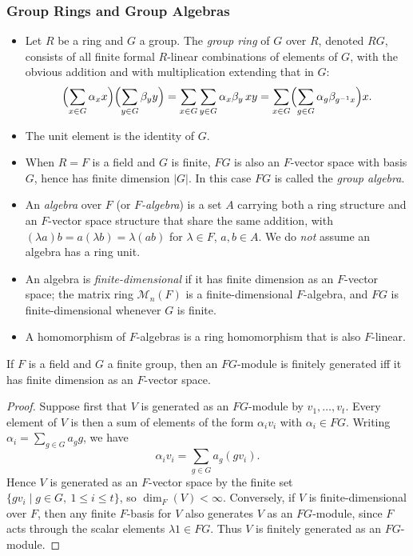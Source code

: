 \documentclass[../Odyssey_Project.tex]{subfiles}
\begin{document}
\subsubsection*{Group Rings and Group Algebras}
\begin{itemize}
    \item Let $R$ be a ring and $G$ a group. The \emph{group ring} of $G$ over $R$, denoted $RG$, consists of all finite formal $R$-linear combinations of elements of $G$, with the obvious addition and with multiplication extending that in $G$:
    \[
        \Bigl(\sum_{x \in G} \alpha_x x\Bigr)\Bigl(\sum_{y \in G} \beta_y y\Bigr) = \sum_{x \in G}\sum_{y \in G} \alpha_x \beta_y\, xy = \sum_{x \in G}\Bigl(\sum_{g \in G} \alpha_g \beta_{g^{-1} x}\Bigr) x.
    \]
    \item The unit element is the identity of $G$.
    \item When $R = F$ is a field and $G$ is finite, $FG$ is also an $F$-vector space with basis $G$, hence has finite dimension $|G|$. In this case $FG$ is called the \emph{group algebra}.
    \item An \emph{algebra} over $F$ (or \emph{$F$-algebra}) is a set $A$ carrying both a ring structure and an $F$-vector space structure that share the same addition, with $(\lambda a)b = a(\lambda b) = \lambda(ab)$ for $\lambda \in F$, $a, b \in A$. We do \emph{not} assume an algebra has a ring unit.
    \item An algebra is \emph{finite-dimensional} if it has finite dimension as an $F$-vector space; the matrix ring $\mathcal{M}_n(F)$ is a finite-dimensional $F$-algebra, and $FG$ is finite-dimensional whenever $G$ is finite.
    \item A homomorphism of $F$-algebras is a ring homomorphism that is also $F$-linear.
\end{itemize}

\begin{lemma}
\label{lem:12.5}
If $F$ is a field and $G$ a finite group, then an $FG$-module is finitely generated iff it has finite dimension as an $F$-vector space.
\end{lemma}
\begin{proof}
    Suppose first that $V$ is generated as an $FG$-module by $v_1,\ldots,v_t$. Every element of $V$ is then a sum of elements of the form $\alpha_i v_i$ with $\alpha_i \in FG$. Writing $\alpha_i = \sum_{g \in G} a_g g$, we have
    \[
        \alpha_i v_i = \sum_{g \in G} a_g(gv_i).
    \]
    Hence $V$ is generated as an $F$-vector space by the finite set $\{gv_i \mid g \in G,\ 1 \leq i \leq t\}$, so $\dim_F(V) < \infty$. Conversely, if $V$ is finite-dimensional over $F$, then any finite $F$-basis for $V$ also generates $V$ as an $FG$-module, since $F$ acts through the scalar elements $\lambda 1 \in FG$. Thus $V$ is finitely generated as an $FG$-module.
\end{proof}
\end{document}

